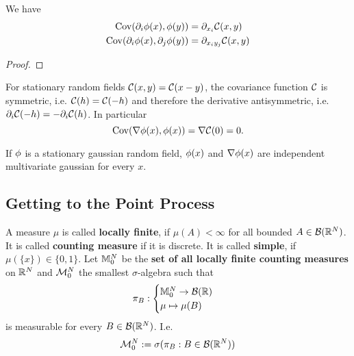 \begin{lemma}
	\label{lem: covariance of derivative}
	We have
	\begin{align*}
		\operatorname{Cov}(\partial_i\phi(x), \phi(y)) &= \partial_{x_i} \mathcal{C}(x,y)\\
		\operatorname{Cov}(\partial_i\phi(x), \partial_j \phi(y)) &= \partial_{x_i y_j} \mathcal{C}(x,y)
	\end{align*}
\end{lemma}
\begin{proof}
\end{proof}
\begin{remark}\label{rem: covariance uncorrelated}
	For stationary random fields \(\mathcal{C}(x,y)=\mathcal{C}(x-y)\), the covariance
	function \(\mathcal{C}\) is symmetric, i.e. \(\mathcal{C}(h)=\mathcal{C}(-h)\)
	and therefore the derivative antisymmetric, i.e.
	\(\partial_i\mathcal{C}(-h)=-\partial_i\mathcal{C}(h)\). In particular
	\begin{equation*}
		\operatorname{Cov}(\nabla\phi(x), \phi(x)) = \nabla \mathcal{C}(0)=0.
	\end{equation*}
\end{remark}
\begin{corollary} \label{cor: uncorr leads to indep in gaussian case}
	If \(\phi\) is a stationary gaussian random field, \(\phi(x)\) and
	\(\nabla\phi(x)\) are independent multivariate gaussian for every \(x\).
\end{corollary}

\subsection{Getting to the Point Process}

A measure \(\mu\) is called \textbf{locally finite}, if \(\mu(A) < \infty\) for
all bounded \(A\in\mathcal{B}(\mathbb{R}^N)\). It is called \textbf{counting measure}
if it is discrete. It is called \textbf{simple}, if
\(\mu(\{x\})\in\{0,1\}\).
Let \(\mathbb{M}^{N}_0\) be the \textbf{set of all locally finite counting measures}
on \(\mathbb{R}^N\) and \(\mathcal{M}^{N}_0\) the smallest \(\sigma\)-algebra
such that
\[
	\pi_B : \begin{cases}
		\mathbb{M}^{N}_0 \to \mathcal{B}(\mathbb{R})\\
		\mu \mapsto \mu(B)
	\end{cases}
\]
is measurable for every \(B\in\mathcal{B}(\mathbb{R}^N)\). I.e.
\[
	\mathcal{M}^{N}_0 := \sigma(\pi_B : B\in\mathcal{B}(\mathbb{R}^N))
\]

